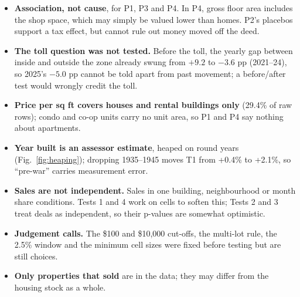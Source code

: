 \documentclass[10pt,a4paper,twocolumn]{article}
\begin{document}
\begin{itemize}
  \item \textbf{Association, not cause}, for P1, P3 and P4. In P4, gross floor area includes the
  shop space, which may simply be valued lower than homes. P2's placebos support a tax effect, but
  cannot rule out money moved off the deed.
  \item \textbf{The toll question was not tested.} Before the toll, the yearly gap between inside
  and outside the zone already swung from $+9.2$ to $-3.6$ pp (2021--24), so 2025's $-5.0$ pp cannot
  be told apart from past movement; a before/after test would wrongly credit the toll.
  \item \textbf{Price per sq ft covers houses and rental buildings only} (29.4\% of raw rows); condo
  and co-op units carry no unit area, so P1 and P4 say nothing about apartments.
  \item \textbf{Year built is an assessor estimate}, heaped on round years (Fig.~\ref{fig:heaping});
  dropping 1935--1945 moves T1 from +0.4\% to +2.1\%, so ``pre-war'' carries measurement error.
  \item \textbf{Sales are not independent.} Sales in one building, neighbourhood or month share
  conditions. Tests 1 and 4 work on cells to soften this; Tests 2 and 3 treat deals as independent,
  so their p-values are somewhat optimistic.
  \item \textbf{Judgement calls.} The \$100 and \$10,000 cut-offs, the multi-lot rule, the 2.5\%
  window and the minimum cell sizes were fixed before testing but are still choices.
  \item \textbf{Only properties that sold} are in the data; they may differ from the housing stock
  as a whole.
\end{itemize}
\end{document}
